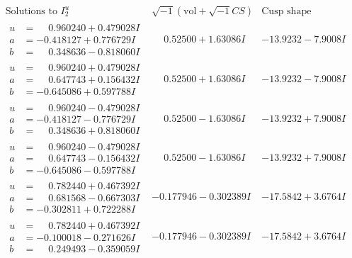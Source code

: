 \documentclass[1p]{elsarticle_modified}
\theoremstyle{definition}
\newcommand{\I}{\sqrt{-1}}
\begin{document}
$$\begin{array}{c|c|c}  
\text{Solutions to }I^u_{2}& \I (\text{vol} + \sqrt{-1}CS) & \text{Cusp shape}\\
 \hline 
\begin{aligned}
u &= \phantom{-}0.960240 + 0.479028 I \\
a &= -0.418127 + 0.776729 I \\
b &= \phantom{-}0.348636 - 0.818060 I\end{aligned}
 & \phantom{-}0.52500 + 1.63086 I & -13.9232 - 7.9008 I \\ \hline\begin{aligned}
u &= \phantom{-}0.960240 + 0.479028 I \\
a &= \phantom{-}0.647743 + 0.156432 I \\
b &= -0.645086 + 0.597788 I\end{aligned}
 & \phantom{-}0.52500 + 1.63086 I & -13.9232 - 7.9008 I \\ \hline\begin{aligned}
u &= \phantom{-}0.960240 - 0.479028 I \\
a &= -0.418127 - 0.776729 I \\
b &= \phantom{-}0.348636 + 0.818060 I\end{aligned}
 & \phantom{-}0.52500 - 1.63086 I & -13.9232 + 7.9008 I \\ \hline\begin{aligned}
u &= \phantom{-}0.960240 - 0.479028 I \\
a &= \phantom{-}0.647743 - 0.156432 I \\
b &= -0.645086 - 0.597788 I\end{aligned}
 & \phantom{-}0.52500 - 1.63086 I & -13.9232 + 7.9008 I \\ \hline\begin{aligned}
u &= \phantom{-}0.782440 + 0.467392 I \\
a &= \phantom{-}0.681568 - 0.667303 I \\
b &= -0.302811 + 0.722288 I\end{aligned}
 & -0.177946 - 0.302389 I & -17.5842 + 3.6764 I \\ \hline\begin{aligned}
u &= \phantom{-}0.782440 + 0.467392 I \\
a &= -0.100018 - 0.271626 I \\
b &= \phantom{-}0.249493 - 0.359059 I\end{aligned}
 & -0.177946 - 0.302389 I & -17.5842 + 3.6764 I \\ \hline\begin{aligned}

\end{aligned}
\end{array}$$
\end{document}
